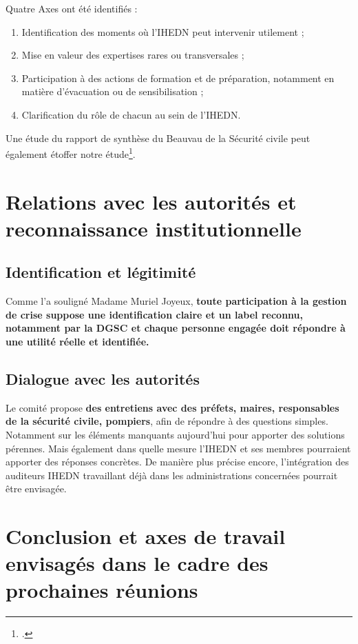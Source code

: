 \documentclass[12pt,a4paper]{article}
\begin{document}
Quatre Axes ont été identifiés :

\begin{enumerate}
\item Identification des moments où l'IHEDN peut intervenir utilement ;
\item Mise en valeur des expertises rares ou transversales ;
\item Participation à des actions de formation et de préparation, notamment en matière d'évacuation ou de sensibilisation ;
\item Clarification du rôle de chacun au sein de l'IHEDN.
\end{enumerate}

Une étude du rapport de synthèse du Beauvau de la Sécurité civile peut également étoffer notre étude\footcite{MI:2025:RDS}.


\section{Relations avec les autorités et reconnaissance institutionnelle}

\subsection{Identification et légitimité}

Comme l'a souligné Madame Muriel Joyeux, \textbf{toute participation à la gestion de crise suppose une identification claire et un label reconnu, notamment par la DGSC et chaque personne engagée doit répondre à une utilité réelle et identifiée.}

\subsection{Dialogue avec les autorités}

Le comité propose \textbf{des entretiens avec des préfets, maires, responsables de la sécurité civile, pompiers}, afin de répondre à des questions simples. Notamment sur les éléments manquants aujourd'hui pour apporter des solutions pérennes. Mais également dans quelle mesure l'IHEDN et ses membres pourraient apporter des réponses concrètes. De manière plus précise encore, l'intégration des auditeurs IHEDN travaillant déjà dans les administrations concernées pourrait être envisagée.

\newpage

\section{Conclusion et axes de travail envisagés dans le cadre des prochaines réunions}
\end{document}
